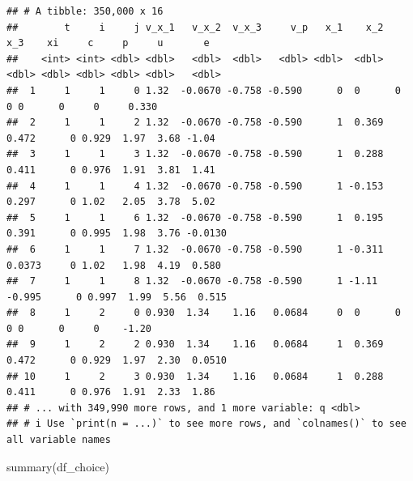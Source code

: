 \documentclass[
]{book}
\newenvironment{Shaded}{\begin{snugshade}}{\end{snugshade}}
\newcommand{\FunctionTok}[1]{\textcolor[rgb]{0.00,0.00,0.00}{#1}}
\newcommand{\NormalTok}[1]{#1}
\begin{document}
\begin{verbatim}
## # A tibble: 350,000 x 16
##        t     i     j v_x_1   v_x_2  v_x_3     v_p   x_1    x_2     x_3    xi     c     p     u       e
##    <int> <int> <dbl> <dbl>   <dbl>  <dbl>   <dbl> <dbl>  <dbl>   <dbl> <dbl> <dbl> <dbl> <dbl>   <dbl>
##  1     1     1     0 1.32  -0.0670 -0.758 -0.590      0  0      0          0 0      0     0     0.330 
##  2     1     1     2 1.32  -0.0670 -0.758 -0.590      1  0.369  0.472      0 0.929  1.97  3.68 -1.04  
##  3     1     1     3 1.32  -0.0670 -0.758 -0.590      1  0.288  0.411      0 0.976  1.91  3.81  1.41  
##  4     1     1     4 1.32  -0.0670 -0.758 -0.590      1 -0.153  0.297      0 1.02   2.05  3.78  5.02  
##  5     1     1     6 1.32  -0.0670 -0.758 -0.590      1  0.195  0.391      0 0.995  1.98  3.76 -0.0130
##  6     1     1     7 1.32  -0.0670 -0.758 -0.590      1 -0.311  0.0373     0 1.02   1.98  4.19  0.580 
##  7     1     1     8 1.32  -0.0670 -0.758 -0.590      1 -1.11  -0.995      0 0.997  1.99  5.56  0.515 
##  8     1     2     0 0.930  1.34    1.16   0.0684     0  0      0          0 0      0     0    -1.20  
##  9     1     2     2 0.930  1.34    1.16   0.0684     1  0.369  0.472      0 0.929  1.97  2.30  0.0510
## 10     1     2     3 0.930  1.34    1.16   0.0684     1  0.288  0.411      0 0.976  1.91  2.33  1.86  
## # ... with 349,990 more rows, and 1 more variable: q <dbl>
## # i Use `print(n = ...)` to see more rows, and `colnames()` to see all variable names
\end{verbatim}

\begin{Shaded}
\begin{Highlighting}[]
\FunctionTok{summary}\NormalTok{(df\_choice)}
\end{Highlighting}
\end{Shaded}
\end{document}
